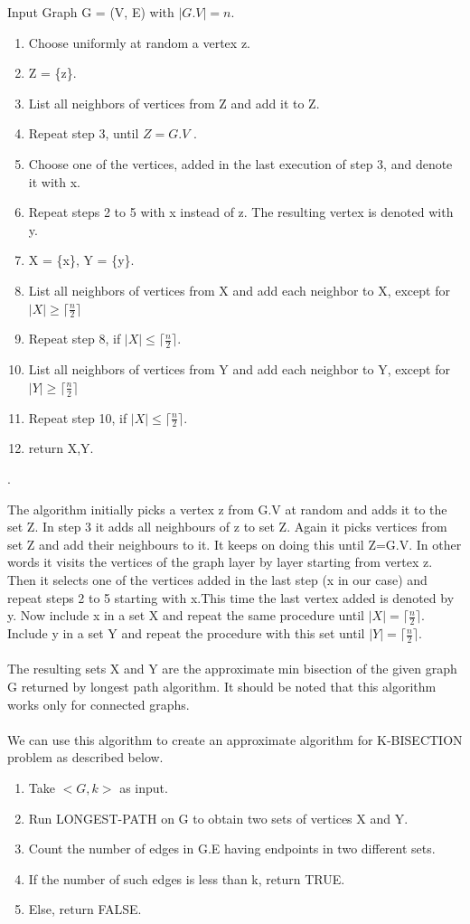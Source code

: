 \documentclass[10pt]{article}
\begin{document}
Input Graph G = (V, E) with $|G.V | = n$.
\begin{enumerate}
    \item Choose uniformly at random a vertex z.
    \item Z = \{z\}.
    \item List all neighbors of vertices from Z and add it to Z.
    \item Repeat step 3, until $Z = G.V$ .
    \item Choose one of the vertices, added in the last execution of step 3,
    and denote it with x.
    \item Repeat steps 2 to 5 with x instead of z. The resulting vertex is
    denoted with y.
    \item  X = \{x\}, Y = \{y\}.
    \item List all neighbors of vertices from X and add each neighbor to X, except for $|X| \geq \lceil\frac{n}{2}\rceil$
    \item Repeat step 8, if $|X| \le \lceil\frac{n}{2}\rceil$.
    \item List all neighbors of vertices from Y and add each neighbor to Y, except for $|Y| \geq \lceil\frac{n}{2}\rceil$
    \item Repeat step 10, if $|X| \le \lceil\frac{n}{2}\rceil$.
    \item return X,Y.
\end{enumerate}.

The algorithm initially picks a vertex z from G.V at random and adds it to the set Z. In step 3 it adds all neighbours of z to set Z. Again it picks vertices from set Z and add their neighbours to it. It keeps on doing this until Z=G.V. In other words it visits the vertices of the graph layer by layer starting from vertex z. Then it selects one of the vertices added in the last step (x in our case) and repeat steps 2 to 5 starting with x.This time the last vertex added is denoted by y. Now include x in a set X and repeat the same procedure until $|X| = \lceil\frac{n}{2}\rceil$. Include y in a set Y and repeat the procedure with this set until  $|Y| = \lceil\frac{n}{2}\rceil$.\\\\
The resulting sets X and Y are the approximate min bisection of the given graph G returned by longest path algorithm. It should be noted that this algorithm works only for connected graphs.\\\\
We can use this algorithm to create an approximate algorithm for K-BISECTION problem as described below.
\begin{enumerate}
    \item Take $<G,k>$ as input.
    \item Run LONGEST-PATH on G to obtain two sets of vertices X and Y.
    \item Count the number of edges in G.E having endpoints in two different sets.
    \item If the number of such edges is less than k, return TRUE.
    \item Else, return FALSE.
\end{enumerate}
\end{document}
